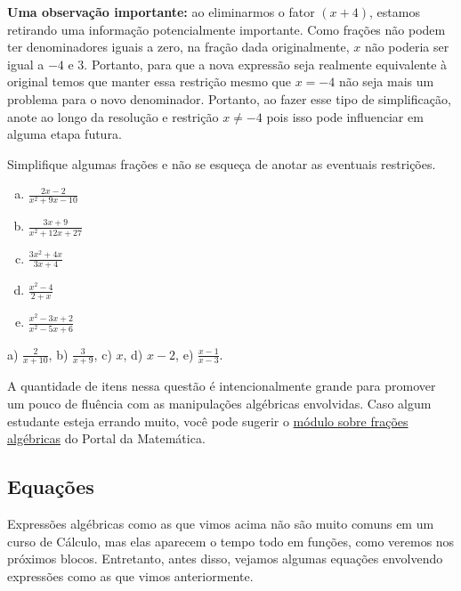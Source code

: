 \documentclass[main.tex]{subfiles}
\begin{document}
\textbf{Uma observação importante:} ao eliminarmos o fator $(x+4)$, estamos retirando uma informação potencialmente importante. Como frações não podem ter denominadores iguais a zero, na fração dada originalmente, $x$ não poderia ser igual a $-4$ e $3$. Portanto, para que a nova expressão seja realmente equivalente à original temos que manter essa restrição mesmo que $x=-4$ não seja mais um problema para o novo denominador. Portanto, ao fazer esse tipo de simplificação, anote ao longo da resolução e restrição $x \neq -4$ pois isso pode influenciar em alguma etapa futura.

\begin{questao}
Simplifique algumas frações e não se esqueça de anotar as eventuais restrições.
\begin{enumerate}[a)]
\item $\frac{2x-2}{x^2+9x-10}$
\item $\frac{3x+9}{x^2+12x+27}$
\item $\frac{3x^2+4x}{3x+4}$
\item $\frac{x^2-4}{2+x}$
\item $\frac{x^2-3x+2}{x^2-5x+6}$
\end{enumerate}
\end{questao}

\begin{gabarito}
	\begin{gabaritoQuestao}
		a) $\frac{2}{x+10}$, b) $\frac{3}{x+9}$, c) $x$, d) $x-2$, e) $\frac{x-1}{x-3}$.
	\end{gabaritoQuestao}
\end{gabarito}

\paraTutores

A quantidade de itens nessa questão é intencionalmente grande para promover um pouco de fluência com as manipulações algébricas envolvidas. Caso algum estudante esteja errando muito, você pode sugerir o \href{https://portaldaobmep.impa.br/index.php/modulo/ver?modulo=38}{módulo sobre frações algébricas} do Portal da Matemática.

\paraAmbos

\subsection*{Equações}

Expressões algébricas como as que vimos acima não são muito comuns em um curso de Cálculo, mas elas aparecem o tempo todo em funções, como veremos nos próximos blocos. Entretanto, antes disso, vejamos algumas equações envolvendo expressões como as que vimos anteriormente.
\end{document}
